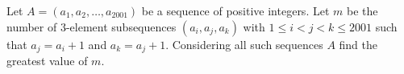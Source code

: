 Let $A=\left(a_1,a_2,\ldots,a_{2001}\right)$ be a sequence of positive integers. Let $m$ be the number of $3$-element subsequences $\left(a_i,a_j,a_k\right)$ with $1\leq i<j<k\leq2001$ such that $a_j=a_i+1$ and $a_k=a_j+1$. Considering all such sequences $A$ find the greatest value of $m$.